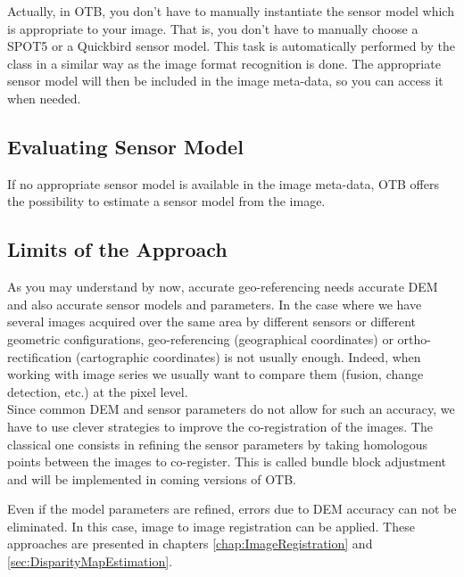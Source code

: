 Actually, in OTB, you don't have to manually instantiate the sensor
model which is appropriate to your image. That is, you don't have to
manually choose a SPOT5 or a Quickbird sensor model. This task is
automatically performed by the  class in
a similar way as the image format recognition is done. The appropriate
sensor model will then be included in the image meta-data, so you can
access it when needed.

\ifitkFullVersion

\fi

\subsection{Evaluating Sensor Model}
\label{sec:EvaluatingSensorModels}

If no appropriate sensor model is available in the image meta-data,
OTB offers the possibility to estimate a sensor model from the image.




\subsection{Limits of the Approach}
\label{LimitsoftheApproach}

As you may understand by now, accurate geo-referencing needs accurate
DEM and also accurate sensor models and parameters. In the case where
we have several images acquired over the same area by different
sensors or different geometric configurations, geo-referencing (geographical coordinates) or ortho-rectification
(cartographic coordinates) is not usually enough. Indeed, when working
with image series we usually want to compare them (fusion, change
detection, etc.) at the pixel level.\\

Since common DEM and sensor parameters do not allow for such an
accuracy, we have to use clever strategies to improve the
co-registration of the images. The classical one consists in refining
the sensor parameters by taking homologous points between the images
to co-register. This is called bundle block adjustment and will be
implemented in coming versions of OTB.

Even if the model parameters are refined, errors due to DEM accuracy
can not be eliminated. In this case, image to image registration can
be applied. These approaches are presented in chapters
\ref{chap:ImageRegistration} and \ref{sec:DisparityMapEstimation}.


